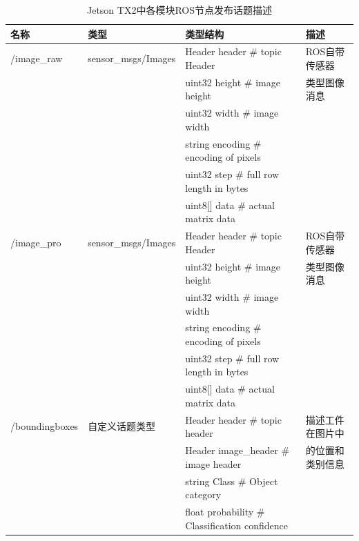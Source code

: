 {
    \begin{table}[htb] 
        \caption{Jetson TX2中各模块ROS节点发布话题描述}
        \label{table:ROS:node_topic}
        \centering
        \begin{tabular}[t]{l|l|l|l}
            \hline
            名称 & 类型 & 类型结构 & 描述  \\
            \hline
            /image\_raw & sensor\_msgs/Images & Header header  \quad    \# topic Header              & ROS自带传感器 \\
                       &                    & uint32 height  \quad    \# image height                & 类型图像消息 \\
                       &                    & uint32 width   \quad    \# image width\\
                       &                    & string encoding \quad   \# encoding of pixels\\
                       &                    & uint32 step     \quad   \# full row length in bytes \\
                       &                    & uint8[] data    \quad   \# actual matrix data \\
            \hline 
            /image\_pro  & sensor\_msgs/Images & Header header \quad     \# topic Header              & ROS自带传感器\\
                        &                    & uint32 height   \quad   \# image height                & 类型图像消息 \\
                        &                    & uint32 width     \quad  \# image width\\
                        &                    & string encoding  \quad  \# encoding of pixels\\
                        &                    & uint32 step      \quad  \# full row length in bytes\\
                        &                    & uint8[] data      \quad \# actual matrix data\\
            \hline
            /boundingboxes & 自定义话题类型 & Header header         \quad  \# topic header    & 描述工件在图片中\\
                           &               & Header image\_header  \quad  \# image header    & 的位置和类别信息\\
                           &               & string Class          \quad  \# Object category\\
                           &               & float probability     \quad  \# Classification confidence\\

\end{tabular}
\end{table}}
